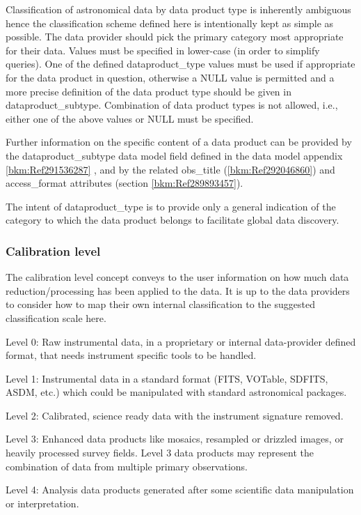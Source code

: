 \documentclass[11pt,a4paper]{ivoa}
\begin{document}
Classification of astronomical data by data product type is inherently ambiguous hence the classification scheme defined
here is intentionally kept as simple as possible.  The data provider should pick the primary category most appropriate
for their data. Values must be specified in lower-case (in order to simplify queries).  One of the defined
dataproduct\_type values must be used if appropriate for the data product in question, otherwise a NULL value is
permitted and a more precise definition of the data product type should be given in dataproduct\_subtype. Combination
of data product types is not allowed, i.e., either one of the above values or NULL must be specified.

Further information on the specific content of a data product can be provided by the dataproduct\_subtype data model
field defined in the data model appendix \ref{bkm:Ref291536287} , and by the related obs\_title
(\ref{bkm:Ref292046860}) and access\_format attributes (section \ref{bkm:Ref289893457}). 

The intent of dataproduct\_type is to provide only a general indication of the category to which the data product
belongs to facilitate global data discovery.

\subsubsection{Calibration level}
\label{bkm:Ref158638048}\label{bkm:Ref287048333}The calibration level concept conveys to the user information on how
much data reduction/processing has been applied to the data.  It is up to the data providers to consider how to map
their own internal classification to the suggested classification scale here.

Level 0:  Raw instrumental data, in a proprietary or internal data-provider defined format, that needs instrument
specific tools to be handled. 

Level 1:  Instrumental data in a standard format (FITS, VOTable, SDFITS, ASDM, etc.) which could be manipulated with
standard astronomical packages.

Level 2: Calibrated, science ready data with the instrument signature removed.

Level 3: Enhanced data products like mosaics, resampled or drizzled images, or heavily processed survey fields.  Level 3
data products may represent the combination of data from multiple primary observations.

Level 4: Analysis data products generated after some scientific data manipulation or interpretation. 
\end{document}
